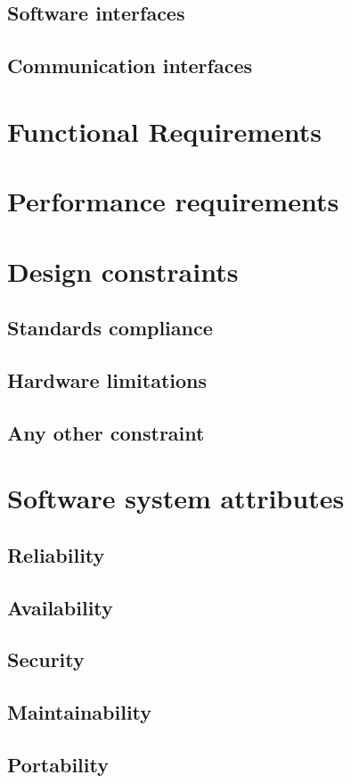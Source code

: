 \documentclass[12pt, a4paper]{report}
\begin{document}
        \subsection{Software interfaces}
        \subsection{Communication interfaces}
    \section{Functional Requirements}
    \section{Performance requirements}
    \section{Design constraints}
        \subsection{Standards compliance}
        \subsection{Hardware limitations}
        \subsection{Any other constraint}
    \section{Software system attributes}
        \subsection{Reliability}
        \subsection{Availability}
        \subsection{Security}
        \subsection{Maintainability}
        \subsection{Portability}
\end{document}
